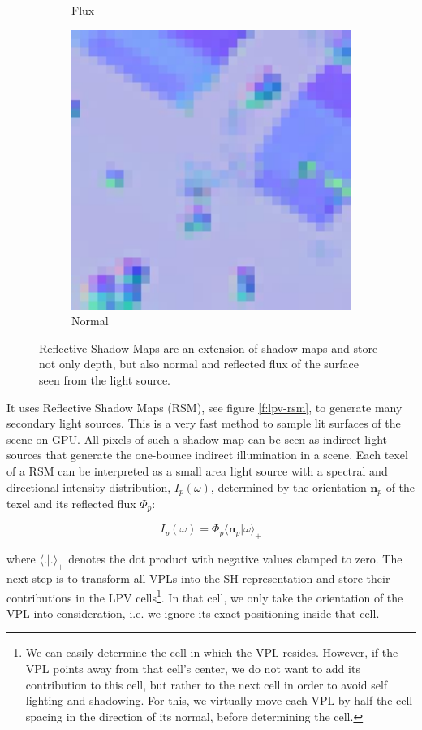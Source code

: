\begin{figure}
\begin{subfigure}[b]{0.32\textwidth}
	\caption{Flux}
\end{subfigure}
\begin{subfigure}[b]{0.32\textwidth}
	\includegraphics[width=1.0\textwidth]{graphics/lpv/lpv-3-3}
	\caption{Normal}
\end{subfigure}
\caption{Reflective Shadow Maps are an extension of shadow maps and store not only depth, but also normal and reflected flux of the surface seen from the light source.}
\end{figure}

It uses Reflective Shadow Maps (RSM), see figure \ref{f:lpv-rsm}, to generate many secondary light sources. This is a very fast method to sample lit surfaces of the scene on GPU. All pixels of such a shadow map can be seen as indirect light sources that generate the one-bounce indirect illumination in a scene. Each texel of a RSM can be interpreted as a small area light source with a spectral and directional intensity distribution, $I_p(\omega)$, determined by the orientation $\mathbf{n}_p$ of the texel and its reflected flux $\Phi_p$:

\begin{equation*}
	I_p(\omega)=\Phi_p\langle\mathbf{n}_p|\omega\rangle_+
\end{equation*}

where $\langle .|. \rangle_+$ denotes the dot product with negative values clamped to zero. The next step is to transform all VPLs into the SH representation and store their contributions in the LPV cells\footnote{We can easily determine the cell in which the VPL resides. However, if the VPL points away from that cell's center, we do not want to add its contribution to this cell, but rather to the next cell in order to avoid self lighting and shadowing. For this, we virtually move each VPL by half the cell spacing in the direction of its normal, before determining the cell.}. In that cell, we only take the orientation of the VPL into consideration, i.e. we ignore its exact positioning inside that cell.

